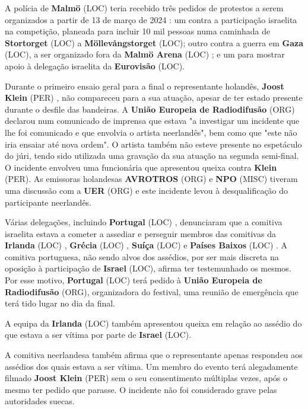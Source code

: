 \documentclass[12pt,a4paper]{article}
\begin{document}
A polícia de \textbf{Malmö} (LOC) teria recebido três pedidos de protestos a serem organizados a partir de 13 de março de 2024 : um contra a participação israelita na competição, planeada para incluir 10 mil pessoas numa caminhada de \textbf{Stortorget} (LOC) a \textbf{Möllevångstorget} (LOC); outro contra a guerra em \textbf{Gaza} (LOC), a ser organizado fora da \textbf{Malmö Arena} (LOC) ; e um para mostrar apoio à delegação israelita da \textbf{Eurovisão} (LOC).

Durante o primeiro ensaio geral para a final o representante holandês, \textbf{Joost Klein} (PER) , não compareceu para a sua atuação, apesar de ter estado presente durante o desfile das bandeiras. A \textbf{União Europeia de Radiodifusão} (ORG) declarou num comunicado de imprensa que estava "a investigar um incidente que lhe foi comunicado e que envolvia o artista neerlandês", bem como que "este não iria ensaiar até nova ordem". O artista também não esteve presente no espetáculo do júri, tendo sido utilizada uma gravação da sua atuação na segunda semi-final. O incidente envolveu uma funcionária que apresentou queixa contra \textbf{Klein} (PER). As emissoras holandesas \textbf{AVROTROS} (ORG) e \textbf{NPO} (MISC) tiveram uma discussão com a \textbf{UER} (ORG) e este incidente levou à desqualificação do participante neerlandês.

Várias delegações, incluindo \textbf{Portugal} (LOC) , denunciaram que a comitiva israelita estava a cometer a assediar e perseguir membros das comitivas da \textbf{Irlanda} (LOC) , \textbf{Grécia} (LOC) , \textbf{Suíça} (LOC) e \textbf{Países Baixos} (LOC) . A comitiva portuguesa, não sendo alvos dos assédios, por ser mais discreta na oposição à participação de \textbf{Israel} (LOC), afirma ter testemunhado os mesmos. Por esse motivo, \textbf{Portugal} (LOC) terá pedido à \textbf{União Europeia de Radiodifusão} (ORG), organizadora do festival, uma reunião de emergência que terá tido lugar no dia da final.

A equipa da \textbf{Irlanda} (LOC) também apresentou queixa em relação ao assédio do que estava a ser vítima por parte de \textbf{Israel} (LOC).

A comitiva neerlandesa também afirma que o representante apenas respondeu aos assédios dos quais estava a ser vítima. Um membro do evento terá alegadamente filmado \textbf{Joost Klein} (PER) sem o seu consentimento múltiplas vezes, após o mesmo ter pedido que parasse. O incidente não foi considerado grave pelas autoridades suecas.
\end{document}
